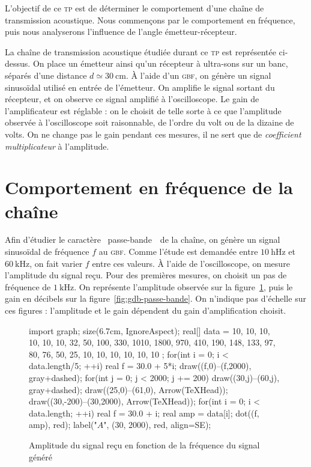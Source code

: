 \documentclass[a4paper,twocolumn,10pt]{report}
\begin{document}
	L'objectif de ce \textsc{tp} est de déterminer le comportement d'une chaîne de transmission acoustique. Nous commençons par le comportement en fréquence, puis nous analyserons l'influence de l'angle émetteur-récepteur.

	La chaîne de transmission acoustique étudiée durant ce \textsc{tp} est représentée ci-dessus. On place un émetteur ainsi qu'un récepteur à ultra-sons sur un banc, séparés d'une distance $d \simeq 30\:\mathrm{cm}$.
	À l'aide d'un \textsc{gbf}, on génère un signal sinusoïdal utilisé en entrée de l'émetteur. On amplifie le signal sortant du récepteur, et on observe ce signal amplifié à l'oscilloscope. Le gain de l'amplificateur est réglable : on le choisit de telle sorte à ce que l'amplitude observée à l'oscilloscope soit raisonnable, de l'ordre du volt ou de la dizaine de volts.
	On ne change pas le gain pendant ces mesures, il ne sert que de \textit{coefficient multiplicateur} à l'amplitude.

	\section{Comportement en fréquence de la chaîne}

	Afin d'étudier le caractère \guillemotleft~passe-bande~\guillemotright\ de la chaîne, on génère un signal sinusoïdal de fréquence $f$\/ au \textsc{gbf}.
	Comme l'étude est demandée entre $10\:\mathrm{hHz}$\/ et $60\:\mathrm{kHz}$, on fait varier $f$\/ entre ces valeurs.
	À l'aide de l'oscilloscope, on mesure l'amplitude du signal reçu.
	Pour des premières mesures, on choisit un pas de fréquence de $1\:\mathrm{kHz}$.
	On représente l'amplitude observée sur la figure~\ref{fig:amp-passe-bande}, puis le gain en décibels sur la figure~\ref{fig:gdb-passe-bande}.
	On n'indique pas d'échelle sur ces figures : l'amplitude et le gain dépendent du gain d'amplification choisit.

	\begin{figure}[H]
		\centering
		\begin{asy}
			import graph;
			size(6.7cm,  IgnoreAspect);
			real[] data = {
				10, 10, 10, 10, 10, 10,
				32, 50, 100, 330, 1010, 1800,
				970, 410, 190, 148, 133, 97,
				80, 76, 50, 25,
				10, 10, 10, 10, 10, 10
			};
			for(int i = 0; i < data.length/5; ++i) {
				real f = 30.0 + 5*i;
				draw((f,0)--(f,2000), gray+dashed);
			}
			for(int j = 0; j < 2000; j += 200) {
				draw((30,j)--(60,j), gray+dashed);
			}
			draw((25,0)--(61,0), Arrow(TeXHead));
			draw((30,-200)--(30,2000), Arrow(TeXHead));
			for(int i = 0; i < data.length; ++i) {
				real f = 30.0 + i;
				real amp = data[i];
				dot((f, amp), red);
			}
			label("\Large$A$", (30, 2000), red, align=SE);
		\end{asy}
		\caption{Amplitude du signal reçu en fonction de la fréquence du signal généré}
		\label{fig:amp-passe-bande}
	\end{figure}
\end{document}
